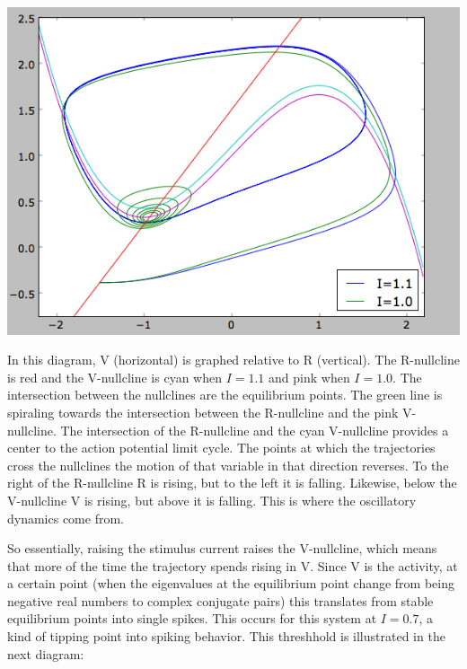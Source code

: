 \documentclass[12pt]{article}
\begin{document}
\vspace{15pt}
\includegraphics[scale=0.71]{phaseplane.png}
\vspace{5pt}

In this diagram, V (horizontal) is graphed relative to R (vertical).  The R-nullcline is red and the V-nullcline is cyan when $I=1.1$ and pink when $I=1.0$.  The intersection between the nullclines are the equilibrium points.  The green line is spiraling towards the intersection between the R-nullcline and the pink V-nullcline.  The intersection of the R-nullcline and the cyan V-nullcline provides a center to the action potential limit cycle.  The points at which the trajectories cross the nullclines the motion of that variable in that direction reverses.  To the right of the R-nullcline R is rising, but to the left it is falling.  Likewise, below the V-nullcline V is rising, but above it is falling.  This is where the oscillatory dynamics come from.  

So essentially, raising the stimulus current raises the V-nullcline, which means that more of the time the trajectory spends rising in V.  Since V is the activity, at a certain point (when the eigenvalues at the equilibrium point change from being negative real numbers to complex conjugate pairs) this translates from stable equilibrium points into single spikes.  This occurs for this system at $I=0.7$, a kind of tipping point into spiking behavior.  This threshhold is illustrated in the next diagram:
\end{document}
